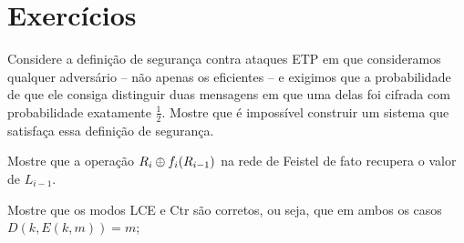 


\section{Exercícios}
\label{sec:exercicios}

\begin{exercicio}
  Considere a definição de segurança contra ataques ETP em que consideramos qualquer adversário -- não apenas os eficientes -- e exigimos que a probabilidade de que ele consiga distinguir duas mensagens em que uma delas foi cifrada com probabilidade exatamente $\frac{1}{2}$.
  Mostre que é impossível construir um sistema que satisfaça essa definição de segurança.
\end{exercicio}

\begin{exercicio}
Mostre que a operação $R_i \oplus f_i(R_{i-1})$ na rede de Feistel de fato recupera o valor de $L_{i-1}$.
\end{exercicio}

\begin{exercicio}
  Mostre que os modos LCE  e Ctr são corretos, ou seja, que em ambos os casos $D(k, E(k,m)) = m$;
\end{exercicio}

